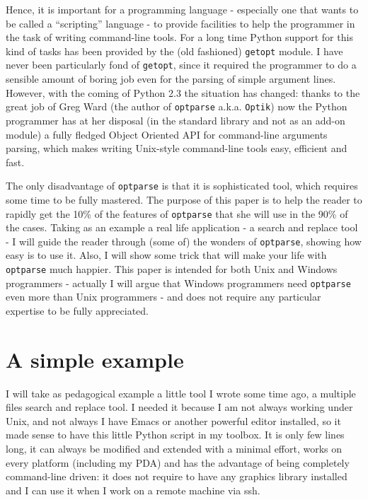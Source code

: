 \documentclass[10pt,english]{article}
\begin{document}
Hence, it is important for a programming language - especially
one that wants to be called a ``scripting'' language - to provide 
facilities to help the programmer in the task of writing command-line 
tools. For a long time Python support for this kind of tasks has 
been provided by the (old fashioned) \texttt{getopt} module. I have never 
been particularly fond of \texttt{getopt}, since it required the programmer 
to do a sensible amount of boring job even for the parsing of simple 
argument lines. However, with the coming of Python 2.3 the situation 
has changed: thanks to the great job of Greg Ward (the author of 
\texttt{optparse} a.k.a. \texttt{Optik}) now the Python programmer 
has at her disposal (in the standard library and not as an 
add-on module) a fully fledged Object Oriented API for 
command-line arguments parsing, which makes writing Unix-style 
command-line tools easy, efficient and fast.

The only disadvantage of \texttt{optparse} is that it is  
sophisticated tool, which requires some time to be fully mastered. 
The purpose of this paper is to help the reader to rapidly get the 
10{\%} of the features of \texttt{optparse} that she will use in the 90{\%} of 
the cases. Taking as an example a real life application - a search and 
replace tool -  I will guide the reader through (some of) the wonders 
of \texttt{optparse}, showing how easy is to use it. Also, I will 
show some trick that will make your life with \texttt{optparse} much happier. 
This paper is intended for both Unix and
Windows programmers - actually I will argue that Windows programmers 
need \texttt{optparse} even more than Unix programmers - and does not
require any particular expertise to be fully appreciated.



\hypertarget{a-simple-example}{}
\section*{A simple example}

I will take as pedagogical example a little tool I wrote some time ago,
a multiple files search and replace tool. I needed it because I am 
not always working under Unix, and not always I have Emacs or 
another powerful editor installed, so it made sense to have this 
little Python script in my toolbox. It is only few lines long,
it can always be modified and extended with a minimal effort,
works on every platform (including my PDA) and has the advantage 
of being completely command-line driven: 
it does not require to have any graphics library installed
and I can use it when I work on a remote machine via ssh.
\end{document}
